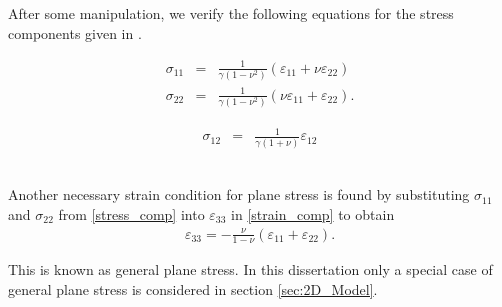 \documentclass[../../main.tex]{subfiles}
\begin{document}
After some manipulation, we verify the following equations for the stress
components given in \cite{Fung65}.

\noindent
\begin{minipage}{.5\linewidth}
	\begin{eqnarray*}
		\sigma_{11} & = & \frac{1}{\gamma(1-\nu^2)} ( \varepsilon_{11} + \nu\varepsilon_{22})\\
		\sigma_{22} & = & \frac{1}{\gamma(1-\nu^2)} (\nu \varepsilon_{11} + \varepsilon_{22}).
	\end{eqnarray*}
\end{minipage}%
\begin{minipage}{.5\linewidth}
	\begin{eqnarray}
		\sigma_{12} & = & \frac{1}{\gamma(1+\nu)} \varepsilon_{12} \label{stress_comp}
	\end{eqnarray}
\end{minipage}\\

Another necessary strain condition for plane stress is found by substituting
$\sigma_{11}$ and $\sigma_{22}$ from \eqref{stress_comp} into
$\varepsilon_{33}$ in \eqref{strain_comp} to obtain
\begin{eqnarray}
	\varepsilon_{33} = -\frac{\nu}{1-\nu} (\varepsilon_{11} + \varepsilon_{22}).\label{plane_stress_neseccary_condition}
\end{eqnarray}

This is known as general plane stress. In this dissertation only a special case
of general plane stress is considered in section \ref{sec:2D_Model}.
\end{document}
